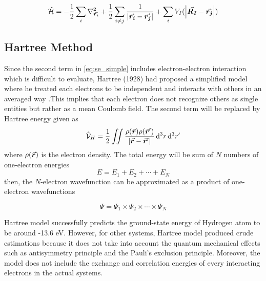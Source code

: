 \begin{equation} \label{eq:se_simple}
	\hat{\mathcal{H}}  = - \frac{1}{2} \sum_i \laplacian_{\va*{r_i}} + \frac{1}{2} \sum_{i\neq j} \frac{1}{\abs{\va*{r_i} - \va*{r_j}}} + \sum_{i} V_{I}(\abs{\va*{R_I} - \va*{r_j}})
\end{equation}
\subsection{Hartree Method}
Since the second term in \eqref{eq:se_simple} includes electron-electron interaction which is difficult to evaluate, Hartree (1928) had proposed a simplified model where he treated each electrons to be independent and interacts with others in an averaged way \citep{Hartree1928}.This implies that each  electron does not recognize others as single entities but rather as a mean Coulomb field. The second term will be replaced by Hartree energy given as
\begin{equation} \label{eq:hartree_E}
	\hat{\mathcal{V}}_H = \frac{1}{2} \iint \frac{\rho(\va*{r}) \rho(\va*{r}')}{\abs{{\va*{r} - \va*{r}'}}} \dd[3]{r} \dd[3]{r'}
\end{equation}
where $\rho(\va*{r})$ is the electron density. The total energy will be sum of $N$ numbers of one-electron energies
\begin{equation}
	E = E_1 + E_2 + \cdots + E_N
\end{equation}
then, the $N$-electron wavefunction can be approximated as a product of one-electron wavefunctions

\begin{equation}
	\Psi = \Psi_1 \times \Psi_2 \times \cdots \times \Psi_N
\end{equation}

Hartree model successfully predicts the ground-state energy of Hydrogen atom to be around -13.6 eV. However, for other systems, Hartree model produced crude estimations because it does not take into account the quantum mechanical effects such as antisymmetry principle and the Pauli's exclusion principle. Moreover, the model does not include the exchange and correlation energies of every interacting electrons in the actual systems.

